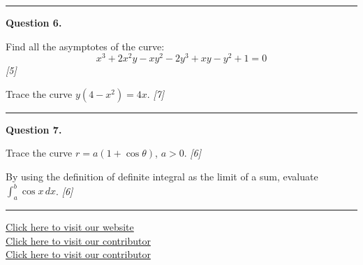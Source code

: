 \documentclass[11pt,a4paper]{article}
\newcommand{\pts}[1]{\hfill   \textit{[#1]}}
\begin{document}
\medskip\rule{\linewidth}{0.2pt}

\medskip


\noindent   \textbf{Question 6.}

\begin{parts}
  \item Find all the asymptotes of the curve:
  \[
  x^3 + 2x^2y - xy^2 - 2y^3 + xy - y^2 + 1 = 0
  \] \pts{5}
  \item Trace the curve $y(4-x^2) = 4x$. \pts{7}
\end{parts}

\medskip\rule{\linewidth}{0.2pt}

\medskip


\noindent   \textbf{Question 7.}

\begin{parts}
  \item Trace the curve $r = a(1 + \cos \theta)$, $a > 0$. \pts{6}
  \item By using the definition of definite integral as the limit of a sum, evaluate $\int_a^b \cos x \, dx$. \pts{6}
\end{parts}

\vfill
\rule{\linewidth}{0.4pt}

\begin{center}\small
  \href{https://bhu-exam.vercel.app/}{Click here to visit our website}\\[4pt]
  \href{https://me-aryan.vercel.app/}{Click here to visit our contributor}\\[4pt]
  \href{https://quashan-me.vercel.app/}{Click here to visit our contributor}
\end{center}
\end{document}
